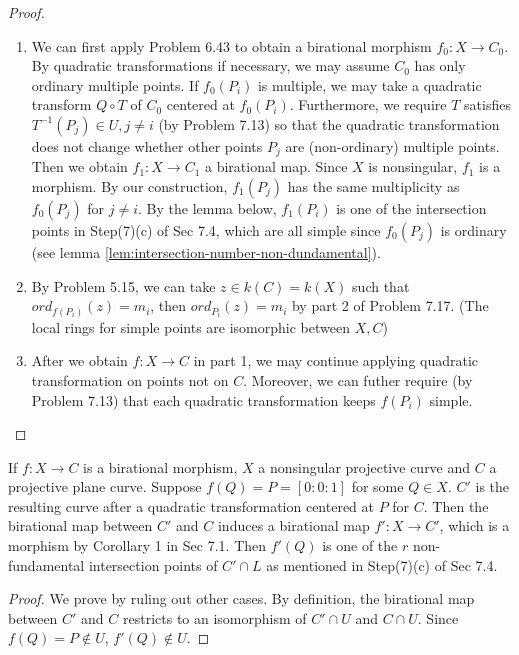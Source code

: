\documentclass{solution}
\begin{document}
\begin{proof}
    \begin{enumerate}
        \item We can first apply Problem 6.43 to obtain a birational morphism $f_0: X \rightarrow C_0$. By quadratic transformations if necessary, we may assume $C_0$ has only ordinary multiple points. If $f_0(P_i)$ is multiple, we may take a quadratic transform $Q \circ T$ of $C_0$ centered at $f_0(P_i)$. Furthermore, we require $T$ satisfies $T ^{-1}(P_j) \in U, j \ne i$ (by Problem 7.13) so that the quadratic transformation does not change whether other points $P_j$ are (non-ordinary) multiple points. Then we obtain $f_1: X \rightarrow C_1$ a birational map. Since $X$ is nonsingular, $f_1$ is a morphism. By our construction, $f_1(P_j)$ has the same multiplicity as $f_0(P_j)$ for $j \ne i$. By the lemma below, $f_1(P_i)$ is one of the intersection points in Step(7)(c) of Sec 7.4, which are all simple since $f_0(P_j)$ is ordinary (see lemma \ref{lem:intersection-number-non-dundamental}).
        \item By Problem 5.15, we can take $z \in k(C) = k(X)$ such that $ord_{f(P_i)}(z) = m_i$, then $ord_{P_i}(z) = m_i$ by part 2 of Problem 7.17. (The local rings for simple points are isomorphic between $X, C$)
        \item After we obtain $f: X \rightarrow C$ in part 1, we may continue applying quadratic transformation on points not on $C$. Moreover, we can futher require (by Problem 7.13) that each quadratic transformation keeps $f(P_i)$ simple.
    \end{enumerate}
\end{proof}

\begin{lemma}
    If $f: X \rightarrow C$ is a birational morphism, $X$ a nonsingular projective curve and $C$ a projective plane curve. Suppose $f(Q) = P = [0:0:1]$ for some $Q \in X$. $C'$ is the resulting curve after a quadratic transformation centered at $P$ for $C$. Then the birational map between $C'$ and $C$ induces a birational map $f': X \rightarrow C'$, which is a morphism by Corollary 1 in Sec 7.1. Then $f'(Q)$ is one of the $r$ non-fundamental intersection points of $C' \cap L$ as mentioned in Step(7)(c) of Sec 7.4.
\end{lemma}

\begin{proof}
    We prove by ruling out other cases. By definition, the birational map between $C'$ and $C$ restricts to an isomorphism of $C' \cap U$ and $C \cap U$. Since $f(Q) = P \notin U$, $f'(Q) \notin U$. \TODO
\end{proof}
\end{document}
